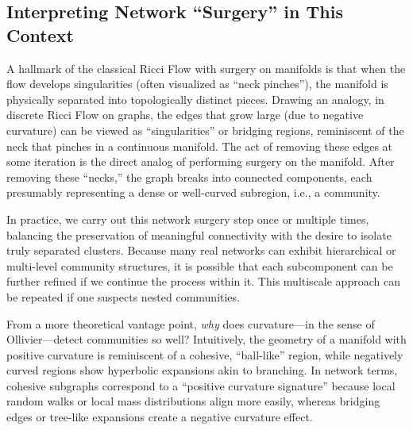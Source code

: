 \subsection{Interpreting Network ``Surgery'' in This Context}
\label{subsec:surgery}

A hallmark of the classical Ricci Flow with surgery on manifolds is that when the flow develops singularities (often visualized as “neck pinches”), the manifold is physically separated into topologically distinct pieces. Drawing an analogy, in discrete Ricci Flow on graphs, the edges that grow large (due to negative curvature) can be viewed as “singularities” or bridging regions, reminiscent of the neck that pinches in a continuous manifold. The act of removing these edges at some iteration is the direct analog of performing surgery on the manifold. After removing these “necks,” the graph breaks into connected components, each presumably representing a dense or well-curved subregion, i.e., a community.

In practice, we carry out this network surgery step once or multiple times, balancing the preservation of meaningful connectivity with the desire to isolate truly separated clusters. Because many real networks can exhibit hierarchical or multi-level community structures, it is possible that each subcomponent can be further refined if we continue the process within it. This multiscale approach can be repeated if one suspects nested communities.

From a more theoretical vantage point, \emph{why} does curvature---in the sense of Ollivier---detect communities so well? Intuitively, the geometry of a manifold with positive curvature is reminiscent of a cohesive, ``ball-like'' region, while negatively curved regions show hyperbolic expansions akin to branching. In network terms, cohesive subgraphs correspond to a “positive curvature signature” because local random walks or local mass distributions align more easily, whereas bridging edges or tree-like expansions create a negative curvature effect. 